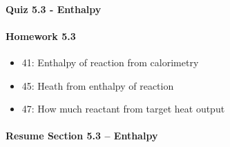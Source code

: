 \documentclass[12pt, openany, letterpaper]{memoir}
\begin{document}
\paragraph*{Quiz 5.3 - Enthalpy}
\paragraph*{Homework 5.3}
\begin{itemize}
  \item 41: Enthalpy of reaction from calorimetry
  \item 45: Heath from enthalpy of reaction
  \item 47: How much reactant from target heat output
\end{itemize}

\paragraph*{Resume Section 5.3 -- Enthalpy}
\end{document}

